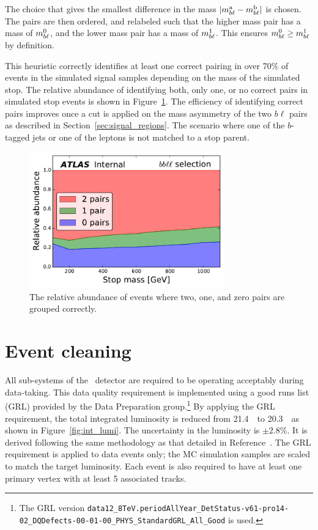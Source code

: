 The choice that gives the
smallest difference in the mass $|m_{b\ell}^\mathrm{a} - m_{b\ell}^\mathrm{b}|$
is chosen.
The pairs are then ordered, and relabeled such that the higher mass pair has a
mass of $m_{b\ell}^{0}$, and the lower mass pair has a mass of $m_{b\ell}^{1}$.
This ensures $m_{b\ell}^{0} \geq m_{b\ell}^{1}$ by definition.

This heuristic correctly identifies at least one correct pairing in over
70\% of events in the simulated signal samples
depending on the mass of the simulated stop. The relative abundance of
identifying both, only one, or no correct pairs in simulated stop events is
shown in Figure~\ref{fig:pairing_eff}.
The efficiency of identifying correct pairs improves once a cut is applied on
the mass asymmetry of the two $b\ell$ pairs as described in
Section~\ref{sec:signal_regions}.
The scenario where one of the $b$-tagged jets or one of the leptons is not
matched to a stop parent.

\begin{figure}[ht]
  \centering
  \includegraphics[width=0.75\textwidth]
    {figs/blstop/PairingEfficiencies/pairing_abundance__inclusive.pdf}
  \caption{
    The relative abundance of events where two, one, and zero
    pairs are grouped correctly.
  }
  \label{fig:pairing_eff}
\end{figure}

\FloatBarrier
\section{Event cleaning}
\label{sec:event_cleaning}

All sub-systems of the \atlas\ detector are required to be operating acceptably
during data-taking. 
This data quality requirement is implemented using a good runs list (GRL)
provided by the Data Preparation group.\footnote{The GRL version
\texttt{data12\_8TeV.periodAllYear\_DetStatus-v61-pro14-02\_DQDefects-00-01-00\_PHYS\_StandardGRL\_All\_Good}
is used.}
By applying the GRL requirement, the total integrated luminosity is reduced
from 21.4~\ifb\ to 20.3~\ifb\ as shown in Figure~\ref{fig:int_lumi}.
The uncertainty in the luminosity is $\pm 2.8$\%.
It is derived following the same methodology as that detailed
in Reference~\cite{Lumi}.
The GRL requirement is applied to data events only; the MC simulation samples
are scaled to match the target luminosity.
Each event is also required to have at least one primary vertex with at least
5 associated tracks.

